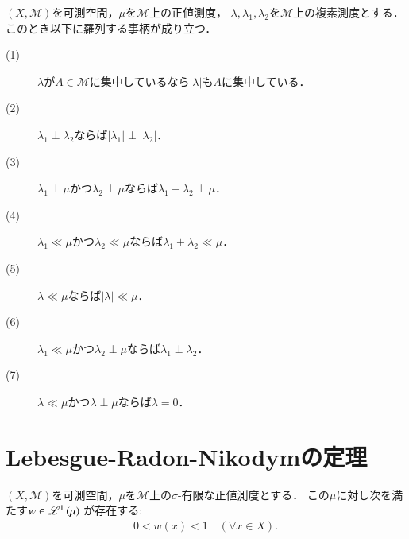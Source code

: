 	\begin{itembox}[l]{}
		\begin{prp}[絶対連続性と特異性に関する性質]
			$(X,\mathcal{M})$を可測空間，$\mu$を$\mathcal{M}$上の正値測度，
			$\lambda,\lambda_1,\lambda_2$を$\mathcal{M}$上の複素測度とする．このとき以下に羅列する事柄が成り立つ．
			\begin{description}
				\item[(1)] $\lambda$が$A \in \mathcal{M}$に集中しているなら$|\lambda|$も$A$に集中している．
				\item[(2)] $\lambda_1 \perp \lambda_2$ならば$|\lambda_1| \perp |\lambda_2|$．
				\item[(3)] $\lambda_1 \perp \mu$かつ$\lambda_2 \perp \mu$ならば$\lambda_1 + \lambda_2 \perp \mu$．
				\item[(4)] $\lambda_1 \ll \mu$かつ$\lambda_2 \ll \mu$ならば$\lambda_1 + \lambda_2 \ll \mu$．
				\item[(5)] $\lambda \ll \mu$ならば$|\lambda| \ll \mu$．
				\item[(6)] $\lambda_1 \ll \mu$かつ$\lambda_2 \perp \mu$ならば$\lambda_1 \perp \lambda_2$．
				\item[(7)] $\lambda \ll \mu$かつ$\lambda \perp \mu$ならば$\lambda = 0$．
			\end{description}
		\end{prp}
	\end{itembox}
	
\section{Lebesgue-Radon-Nikodymの定理}
	\begin{itembox}[l]{}
		\begin{lem}
			$(X,\mathcal{M})$を可測空間，$\mu$を$\mathcal{M}$上の$\sigma$-有限な正値測度とする．
			この$\mu$に対し次を満たす$w \in \mathscr{L}^{1} \left(\mu\right)$\footnotemark
			が存在する:
			\begin{align}
				0 < w(x) < 1 \quad (\forall x \in X).
			\end{align}
		\end{lem}
	\end{itembox}
	
	
